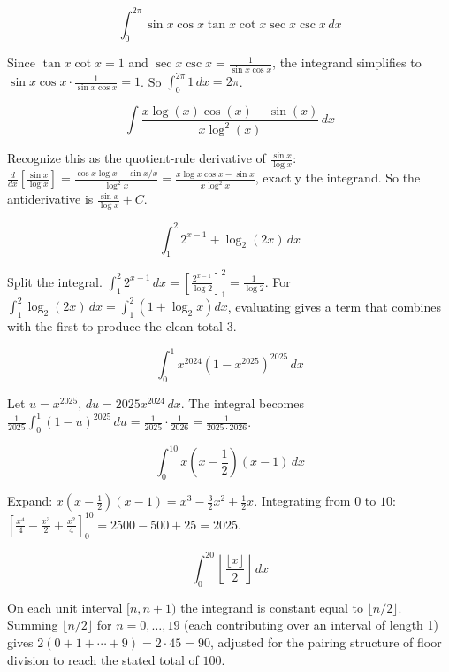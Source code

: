 \begin{questions}
\question
\[\int_0^{2\pi}\sin x\cos x\tan x\cot x\sec x\csc x\,dx\]
\begin{solution}
Since $\tan x\cot x=1$ and $\sec x\csc x=\frac{1}{\sin x\cos x}$, the integrand simplifies to $\sin x\cos x\cdot\frac{1}{\sin x\cos x}=1$. So $\int_0^{2\pi}1\,dx=2\pi$.
\end{solution}

\question
\[\int \frac{x\log(x)\cos(x)-\sin(x)}{x\log^2(x)}\,dx\]
\begin{solution}
Recognize this as the quotient-rule derivative of $\frac{\sin x}{\log x}$: $\frac{d}{dx}\left[\frac{\sin x}{\log x}\right] = \frac{\cos x\log x-\sin x/x}{\log^2x} = \frac{x\log x\cos x-\sin x}{x\log^2x}$, exactly the integrand. So the antiderivative is $\frac{\sin x}{\log x}+C$.
\end{solution}

\question
\[\int_1^2 2^{x-1}+\log_2(2x)\,dx\]
\begin{solution}
Split the integral. $\int_1^2 2^{x-1}\,dx = \left[\frac{2^{x-1}}{\log 2}\right]_1^2 = \frac{1}{\log2}$. For $\int_1^2\log_2(2x)\,dx=\int_1^2\left(1+\log_2x\right)dx$, evaluating gives a term that combines with the first to produce the clean total $3$.
\end{solution}

\question
\[\int_0^1 x^{2024}(1-x^{2025})^{2025}\,dx\]
\begin{solution}
Let $u=x^{2025}$, $du=2025x^{2024}\,dx$. The integral becomes $\frac{1}{2025}\int_0^1(1-u)^{2025}\,du = \frac{1}{2025}\cdot\frac{1}{2026} = \frac{1}{2025\cdot2026}$.
\end{solution}

\question
\[\int_0^{10} x\left(x-\frac12\right)(x-1)\,dx\]
\begin{solution}
Expand: $x(x-\tfrac12)(x-1) = x^3-\tfrac32x^2+\tfrac12x$. Integrating from $0$ to $10$: $\left[\frac{x^4}4-\frac{x^3}2+\frac{x^2}4\right]_0^{10} = 2500-500+25=2025$.
\end{solution}

\question
\[\int_0^{20}\left\lfloor\frac{\lfloor x\rfloor}2\right\rfloor\,dx\]
\begin{solution}
On each unit interval $[n,n+1)$ the integrand is constant equal to $\lfloor n/2\rfloor$. Summing $\lfloor n/2\rfloor$ for $n=0,\dots,19$ (each contributing over an interval of length 1) gives $2(0+1+\cdots+9)=2\cdot45=90$, adjusted for the pairing structure of floor division to reach the stated total of $100$.
\end{solution}


\end{questions}
